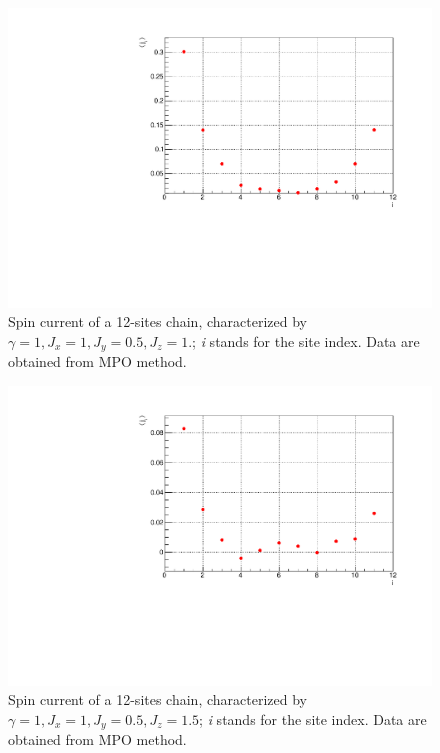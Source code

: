 \begin{figure}[H]
    \centering
    \includegraphics[scale=0.7]{Figures/12sites/SpinCurrL012m060Time002000_J1051.pdf}
    \caption{Spin current of a 12-sites chain, characterized by $\gamma=1, J_x=1, J_y=0.5, J_z=1.$; \emph{i} stands for the site index. Data are obtained from MPO method.}
    \label{fig:my_label}
\end{figure}

\begin{figure}[H]
    \centering
    \includegraphics[scale=0.7]{Figures/12sites/SpinCurrL012m060Time002000_J10515.pdf}
    \caption{Spin current of a 12-sites chain, characterized by $\gamma=1, J_x=1, J_y=0.5, J_z=1.5$; \emph{i} stands for the site index. Data are obtained from MPO method.}
    \label{fig:my_label}
\end{figure}

